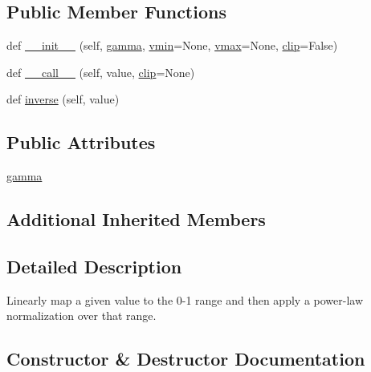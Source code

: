 \subsection*{Public Member Functions}
\begin{DoxyCompactItemize}
\item 
def \hyperlink{classmatplotlib_1_1colors_1_1PowerNorm_a12c7e4fb55e1184a744568334f976863}{\+\_\+\+\_\+init\+\_\+\+\_\+} (self, \hyperlink{classmatplotlib_1_1colors_1_1PowerNorm_abba7fb84d396af1f672b6cc82362fe05}{gamma}, \hyperlink{classmatplotlib_1_1colors_1_1Normalize_a27ff9acd0e6407968e6d41cc91ab8441}{vmin}=None, \hyperlink{classmatplotlib_1_1colors_1_1Normalize_ad433e4289413f8976b886044da439a0f}{vmax}=None, \hyperlink{classmatplotlib_1_1colors_1_1Normalize_a7355c143b0fcdd0ec9998c02e2962a8b}{clip}=False)
\item 
def \hyperlink{classmatplotlib_1_1colors_1_1PowerNorm_a05d95247deec384dfac91185b7a1c581}{\+\_\+\+\_\+call\+\_\+\+\_\+} (self, value, \hyperlink{classmatplotlib_1_1colors_1_1Normalize_a7355c143b0fcdd0ec9998c02e2962a8b}{clip}=None)
\item 
def \hyperlink{classmatplotlib_1_1colors_1_1PowerNorm_a085e87bf813e4e022eb6524c7a7dc361}{inverse} (self, value)
\end{DoxyCompactItemize}
\subsection*{Public Attributes}
\begin{DoxyCompactItemize}
\item 
\hyperlink{classmatplotlib_1_1colors_1_1PowerNorm_abba7fb84d396af1f672b6cc82362fe05}{gamma}
\end{DoxyCompactItemize}
\subsection*{Additional Inherited Members}


\subsection{Detailed Description}
\begin{DoxyVerb}Linearly map a given value to the 0-1 range and then apply
a power-law normalization over that range.
\end{DoxyVerb}
 

\subsection{Constructor \& Destructor Documentation}
\mbox{\label{classmatplotlib_1_1colors_1_1PowerNorm_a12c7e4fb55e1184a744568334f976863}} 
